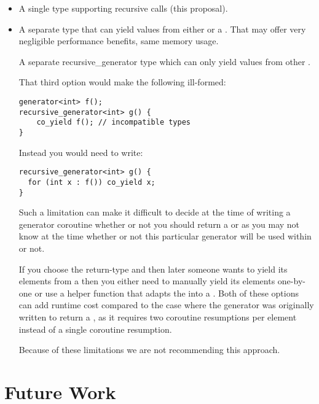 \documentclass{wg21}
\begin{document}
\begin{itemize}
\item A single  type supporting recursive calls (this proposal).

\item A separate type  that can yield values from either  or a . That may offer very negligible performance benefits, same memory usage.

\tcode A separate {recursive_generator} type which can only yield values from other . 

That third option would make the following ill-formed:

\begin{lstlisting}[style=color]
generator<int> f();
recursive_generator<int> g() {
    co_yield f(); // incompatible types
}
\end{lstlisting}

Instead you would need to write:
\begin{lstlisting}[style=color]
recursive_generator<int> g() {
  for (int x : f()) co_yield x;
}
\end{lstlisting}

Such a limitation can make it difficult to decide at the time of writing a generator
coroutine whether or not you should return a  or 
as you may not know at the time whether or not this particular generator will be used
within  or not.

If you choose the  return-type and then later someone wants to yield its
elements from a  then you either need to manually yield its
elements one-by-one or use a helper function that adapts the  into a
. Both of these options can add runtime cost compared to the
case where the generator was originally written to return a ,
as it requires two coroutine resumptions per element instead of a single coroutine resumption.

Because of these limitations we are not recommending this approach.

\end{itemize}

\section{Future Work}
\end{document}
